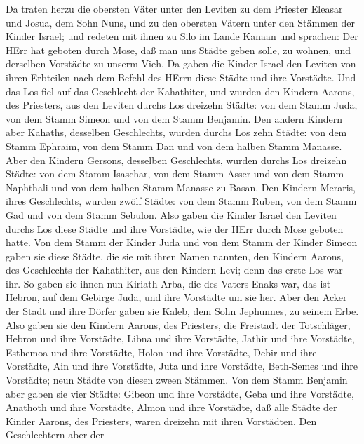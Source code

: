  Da traten herzu die obersten Väter unter den Leviten zu dem
Priester Eleasar und Josua, dem Sohn Nuns, und zu den obersten Vätern
unter den Stämmen der Kinder Israel;  und redeten mit ihnen
zu Silo im Lande Kanaan und sprachen: Der HErr hat geboten durch Mose,
daß man uns Städte geben solle, zu wohnen, und derselben Vorstädte zu
unserm Vieh.  Da gaben die Kinder Israel den Leviten von
ihren Erbteilen nach dem Befehl des HErrn diese Städte und ihre
Vorstädte.  Und das Los fiel auf das Geschlecht der
Kahathiter, und wurden den Kindern Aarons, des Priesters, aus den
Leviten durchs Los dreizehn Städte: von dem Stamm Juda, von dem Stamm
Simeon und von dem Stamm Benjamin.  Den andern Kindern aber
Kahaths, desselben Geschlechts, wurden durchs Los zehn Städte: von dem
Stamm Ephraim, von dem Stamm Dan und von dem halben Stamm Manasse.
 Aber den Kindern Gersons, desselben Geschlechts, wurden
durchs Los dreizehn Städte: von dem Stamm Isaschar, von dem Stamm Asser
und von dem Stamm Naphthali und von dem halben Stamm Manasse zu Basan.
 Den Kindern Meraris, ihres Geschlechts, wurden zwölf
Städte: von dem Stamm Ruben, von dem Stamm Gad und von dem Stamm
Sebulon.  Also gaben die Kinder Israel den Leviten durchs
Los diese Städte und ihre Vorstädte, wie der HErr durch Mose geboten
hatte.  Von dem Stamm der Kinder Juda und von dem Stamm der
Kinder Simeon gaben sie diese Städte, die sie mit ihren Namen nannten,
 den Kindern Aarons, des Geschlechts der Kahathiter, aus
den Kindern Levi; denn das erste Los war ihr.  So gaben sie
ihnen nun Kiriath-Arba, die des Vaters Enaks war, das ist Hebron, auf
dem Gebirge Juda, und ihre Vorstädte um sie her.  Aber den
Acker der Stadt und ihre Dörfer gaben sie Kaleb, dem Sohn Jephunnes, zu
seinem Erbe.  Also gaben sie den Kindern Aarons, des
Priesters, die Freistadt der Totschläger, Hebron und ihre Vorstädte,
Libna und ihre Vorstädte,  Jathir und ihre Vorstädte,
Esthemoa und ihre Vorstädte,  Holon und ihre Vorstädte,
Debir und ihre Vorstädte,  Ain und ihre Vorstädte, Juta und
ihre Vorstädte, Beth-Semes und ihre Vorstädte; neun Städte von diesen
zween Stämmen.  Von dem Stamm Benjamin aber gaben sie vier
Städte: Gibeon und ihre Vorstädte, Geba und ihre Vorstädte,
 Anathoth und ihre Vorstädte, Almon und ihre Vorstädte,
 daß alle Städte der Kinder Aarons, des Priesters, waren
dreizehn mit ihren Vorstädten.  Den Geschlechtern aber der
